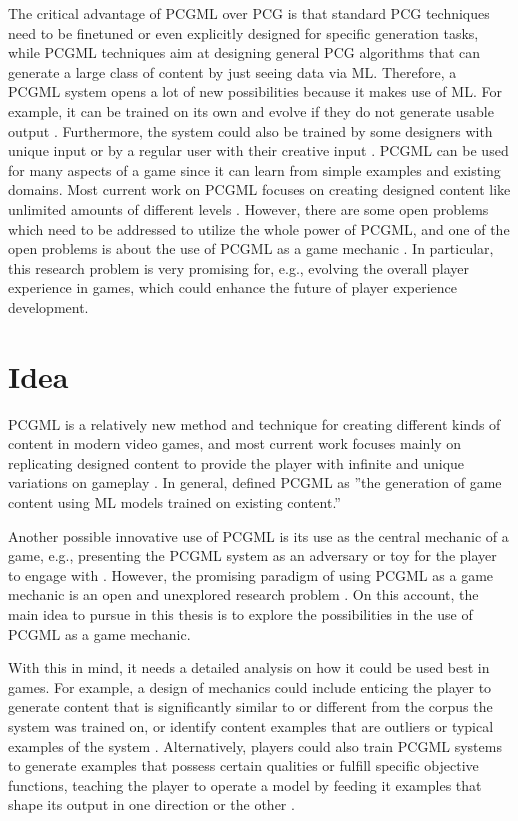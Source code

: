 \documentclass[MGS,Master,english]{twbook}%
\begin{document}
The critical advantage of \ac{PCGML} over \ac{PCG} is that standard \ac{PCG} techniques need to be finetuned or even explicitly designed for specific generation tasks, while \ac{PCGML} techniques aim at designing general \ac{PCG} algorithms that can generate a large class of content by just seeing data via \ac{ML}. Therefore, a \ac{PCGML} system opens a lot of new possibilities because it makes use of \ac{ML}. For example, it can be trained on its own and evolve if they do not generate usable output \cite{pcgml::paper}. Furthermore, the system could also be trained by some designers with unique input or by a regular user with their creative input \cite{pcgml::paper}. \ac{PCGML} can be used for many aspects of a game since it can learn from simple examples and existing domains. Most current work on \ac{PCGML} focuses on creating designed content like unlimited amounts of different levels \cite{pcgml::paper}. However, there are some open problems which need to be addressed to utilize the whole power of \ac{PCGML}, and one of the open problems is about the use of \ac{PCGML} as a game mechanic \cite{pcgml::paper}. In particular, this research problem is very promising for, e.g., evolving the overall player experience in games, which could enhance the future of player experience development.

\section{Idea}
\ac{PCGML} is a relatively new method and technique for creating different kinds of content in modern video games, and most current work focuses mainly on replicating designed content to provide the player with infinite and unique variations on gameplay \cite{pcgml::paper}. In general, \citep[p. 1]{pcgml::paper} defined \ac{PCGML} as ''the generation of game content using \ac{ML} models trained on existing content.''

Another possible innovative use of \ac{PCGML} is its use as the central mechanic of a game, e.g., presenting the \ac{PCGML} system as an adversary or toy for the player to engage with  \cite{pcgml::paper}. However, the promising paradigm of using \ac{PCGML} as a game mechanic is an open and unexplored research problem \cite{pcgml::paper}. On this account, the main idea to pursue in this thesis is to explore the possibilities in the use of \ac{PCGML} as a game mechanic.

With this in mind, it needs a detailed analysis on how it could be used best in games. For example, a design of mechanics could include enticing the player to generate content that is significantly similar to or different from the corpus the system was trained on, or identify content examples that are outliers or typical examples of the system \cite{pcgml::paper}. Alternatively, players could also train \ac{PCGML} systems to generate examples that possess certain qualities or fulfill specific objective functions, teaching the player to operate a model by feeding it examples that shape its output in one direction or the other \cite{pcgml::paper}.
\end{document}
